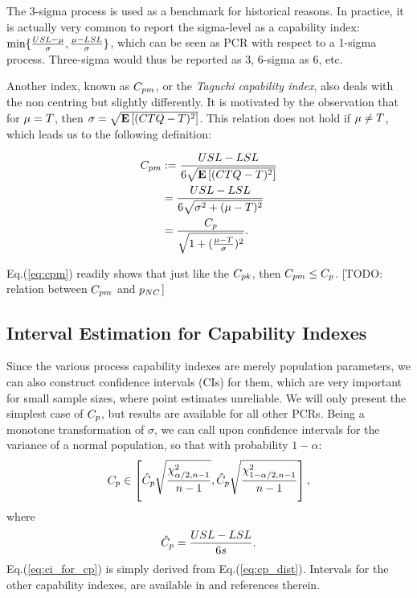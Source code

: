 The 3-sigma process is used as a benchmark for historical reasons. 
In practice, it is actually very common to report the sigma-level as a capability index: $\min\{ \frac{USL-\mu}{\sigma},\frac{\mu-LSL}{\sigma} \}$, which can be seen as PCR with respect to a 1-sigma process.
Three-sigma would thus be reported as $3$, 6-sigma as $6$, etc.


Another index, known as $\cpm$, or the \emph{Taguchi capability index}, also deals with the non centring but slightly differently. 
It is motivated by the observation that for $\mu=T$, then $\sigma=\sqrt{\mathbf{E}\left[ (CTQ-T)^2 \right]}$. This relation does not hold if $\mu \not=T$, which leads us to the following definition:
\begin{definition}[$\cpm$]
\begin{align}
		C_{pm} &:= \frac{USL-LSL}{6 \sqrt{\mathbf{E}\left[ (CTQ-T)^2 \right]}} \\
		&= 	\frac{USL-LSL}{6 \sqrt{\sigma^2+(\mu-T)^2}} \\ 
		&= \frac{C_p}{\sqrt{1+(\frac{\mu-T}{\sigma})^2}}. \label{eq:cpm}
\end{align}
\end{definition}
Eq.(\ref{eq:cpm}) readily shows that just like the $C_{pk}$, then $C_{pm} \leq C_p$. 
[TODO: relation between $\cpm$ and $p_{NC}$]







\subsection{Interval Estimation for Capability Indexes}
Since the various process capability indexes are merely population parameters, we can also construct confidence intervals (CIs) for them, which are very important for small sample sizes, where point estimates unreliable.
We will only present the simplest case of $C_p$, but results are available for all other PCRs. Being a monotone transformation of $\sigma$, we can call upon confidence intervals for the variance of a normal population, so that with probability $1-\alpha$:
\begin{align}
\label{eq:ci_for_cp}
	C_p \in \left[ 
		\hat{C}_p \sqrt{\frac{\chi^2_{\alpha/2,n-1}}{n-1}},
		\hat{C}_p \sqrt{\frac{\chi^2_{1-\alpha/2,n-1}}{n-1}}
	\right],
\end{align}
where 
\begin{align}
\label{eq:cpHat}
\hat{C}_p = \frac{USL-LSL}{6 s}.
\end{align}
Eq.(\ref{eq:ci_for_cp}) is simply derived from Eq.(\ref{eq:cp_dist}).
Intervals for the other capability indexes, are available in \cite{montgomery_introduction_2007} and references therein. 




